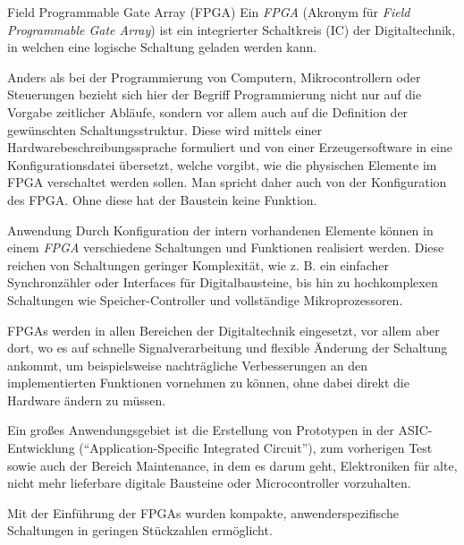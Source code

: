 \begin{defi}{Field Programmable Gate Array (FPGA)}
    Ein \emph{FPGA} (Akronym für \emph{Field Programmable Gate Array}) ist ein integrierter Schaltkreis (IC) der Digitaltechnik, in welchen eine logische Schaltung geladen werden kann.

    Anders als bei der Programmierung von Computern, Mikrocontrollern oder Steuerungen bezieht sich hier der Begriff Programmierung nicht nur auf die Vorgabe zeitlicher Abläufe, sondern vor allem auch auf die Definition der gewünschten Schaltungsstruktur.
    Diese wird mittels einer Hardwarebeschreibungssprache formuliert und von einer Erzeugersoftware in eine Konfigurationsdatei übersetzt, welche vorgibt, wie die physischen Elemente im FPGA verschaltet werden sollen.
    Man spricht daher auch von der Konfiguration des FPGA.
    Ohne diese hat der Baustein keine Funktion.
\end{defi}

\begin{bonus}{Anwendung}
    Durch Konfiguration der intern vorhandenen Elemente können in einem \emph{FPGA} verschiedene Schaltungen und Funktionen realisiert werden.
    Diese reichen von Schaltungen geringer Komplexität, wie z. B. ein einfacher Synchronzähler oder Interfaces für Digitalbausteine, bis hin zu hochkomplexen Schaltungen wie Speicher-Controller und vollständige Mikroprozessoren.

    FPGAs werden in allen Bereichen der Digitaltechnik eingesetzt, vor allem aber dort, wo es auf schnelle Signalverarbeitung und flexible Änderung der Schaltung ankommt, um beispielsweise nachträgliche Verbesserungen an den implementierten Funktionen vornehmen zu können, ohne dabei direkt die Hardware ändern zu müssen.

    Ein großes Anwendungsgebiet ist die Erstellung von Prototypen in der ASIC-Entwicklung (\enquote{Application-Specific Integrated Circuit}), zum vorherigen Test sowie auch der Bereich Maintenance, in dem es darum geht, Elektroniken für alte, nicht mehr lieferbare digitale Bausteine oder Microcontroller vorzuhalten.

    Mit der Einführung der FPGAs wurden kompakte, anwenderspezifische Schaltungen in geringen Stückzahlen ermöglicht.
\end{bonus}